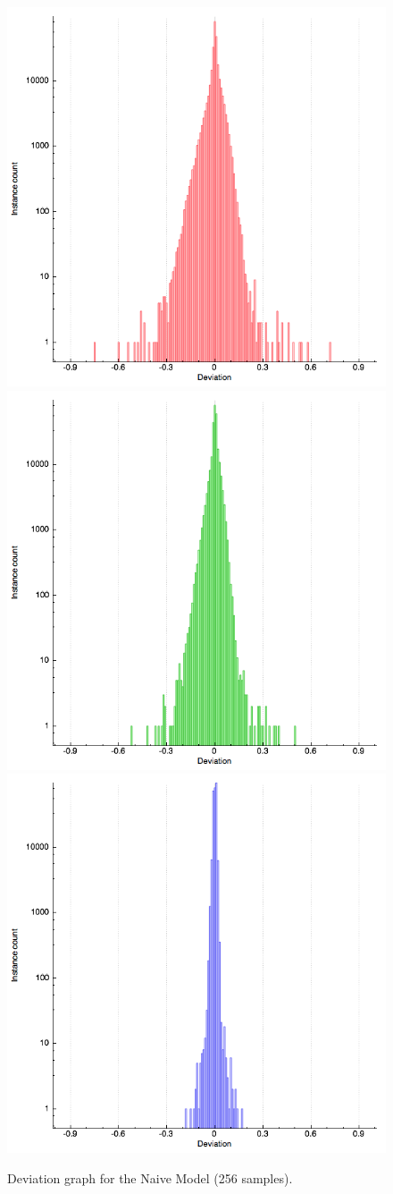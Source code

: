\documentclass{article}
\begin{document}
\begin{figure}[p]
\centering
\includegraphics[width=.5\textwidth]{assets/diffuse-naive_plot_6_red} \\
\includegraphics[width=.5\textwidth]{assets/diffuse-naive_plot_6_green} \\
\includegraphics[width=.5\textwidth]{assets/diffuse-naive_plot_6_blue}
\caption{Deviation graph for the Naive Model (256 samples).}
\label{fig:naive_stdev_details}
\end{figure}
\end{document}
